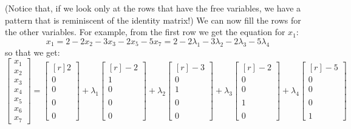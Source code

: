 \documentclass[12pt]{article}
\begin{document}
\begin{enumerate}
\[\]
(Notice that, if we look only at the rows that have the free variables, we have a pattern that is reminiscent of the identity matrix!)
We can now fill the rows for the other variables. For example, from the first row we get the equation for $x_1$:
\[
x_1=2-2x_2-3x_3-2x_5-5x_7=2-2\lambda_1-3\lambda_2-2\lambda_3-5\lambda_4
\]
so that we get:
\[
\begin{bmatrix}x_1\\x_2\\x_3\\x_4\\x_5\\x_6\\x_7\end{bmatrix}
=
\begin{bmatrix*}[r]            2 \\ 0\\ 0\\ \\ 0\\ \\ 0\end{bmatrix*}
+\lambda_1\begin{bmatrix*}[r] -2 \\ 1\\ 0\\ \\ 0\\ \\ 0\end{bmatrix*}
+\lambda_2\begin{bmatrix*}[r] -3 \\ 0\\ 1\\ \\ 0\\ \\ 0\end{bmatrix*}
+\lambda_3\begin{bmatrix*}[r] -2 \\ 0\\ 0\\ \\ 1\\ \\ 0\end{bmatrix*}
+\lambda_4\begin{bmatrix*}[r] -5 \\ 0\\ 0\\ \\ 0\\ \\ 1\end{bmatrix*}
\]
\end{enumerate}
\end{document}

